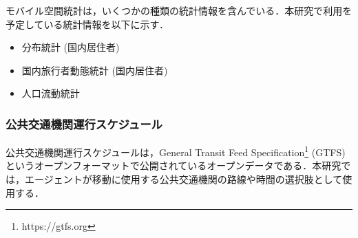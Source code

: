 モバイル空間統計は，いくつかの種類の統計情報を含んでいる．本研究で利用を予定している統計情報を以下に示す．

\begin{itemize}
  \item 分布統計 (国内居住者)
  \item 国内旅行者動態統計 (国内居住者)
  \item 人口流動統計
\end{itemize}

\subsubsection{公共交通機関運行スケジュール}
公共交通機関運行スケジュールは，General Transit Feed Specification\footnote{https://gtfs.org} (GTFS) というオープンフォーマットで公開されているオープンデータである．本研究では，エージェントが移動に使用する公共交通機関の路線や時間の選択肢として使用する．
